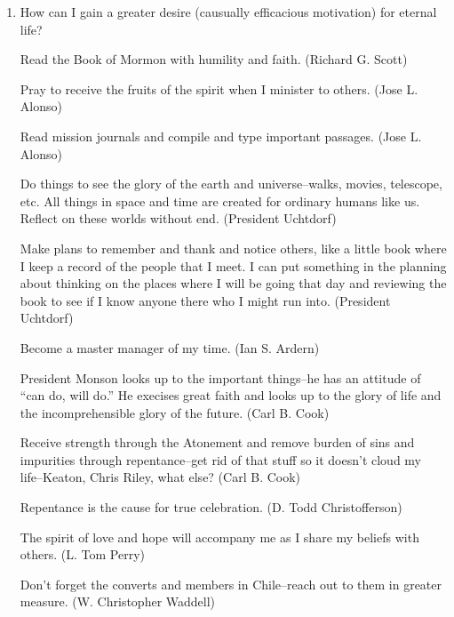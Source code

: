 \begin{enumerate}
George Q. Cannon, JD 26:

\begin{quotation}
Let the Teachers visit under the influence of the Spirit of God and the gift of discernment, and where they find those that are living in opposition to, or in violation of the laws of God, let them, by the Spirit of God, which will rest upon them, teach and warn that household, and thus take steps to purify the Church.
\end{quotation}

\item How can I gain a greater desire (causually efficacious motivation) for eternal life?

Read the Book of Mormon with humility and faith. (Richard G. Scott) %

Pray to receive the fruits of the spirit when I minister to others. (Jose L. Alonso)

Read mission journals and compile and type important passages. (Jose L. Alonso)

Do things to see the glory of the earth and universe--walks, movies, telescope, etc. All things in space and time are created for ordinary humans like us. Reflect on these worlds without end. (President Uchtdorf)

Make plans to remember and thank and notice others, like a little book where I keep a record of the people that I meet. I can put something in the planning about thinking on the places where I will be going that day and reviewing the book to see if I know anyone there who I might run into. (President Uchtdorf)

Become a master manager of my time. (Ian S. Ardern)

President Monson looks up to the important things--he has an attitude of ``can do, will do.'' He execises great faith and looks up to the glory of life and the incomprehensible glory of the future. (Carl B. Cook)

Receive strength through the Atonement and remove burden of sins and impurities through repentance--get rid of that stuff so it doesn't cloud my life--Keaton, Chris Riley, what else? (Carl B. Cook)

Repentance is the cause for true celebration. (D. Todd Christofferson)

The spirit of love and hope will accompany me as I share my beliefs with others. (L. Tom Perry)

Don't forget the converts and members in Chile--reach out to them in greater measure. (W. Christopher Waddell)


\end{enumerate}
